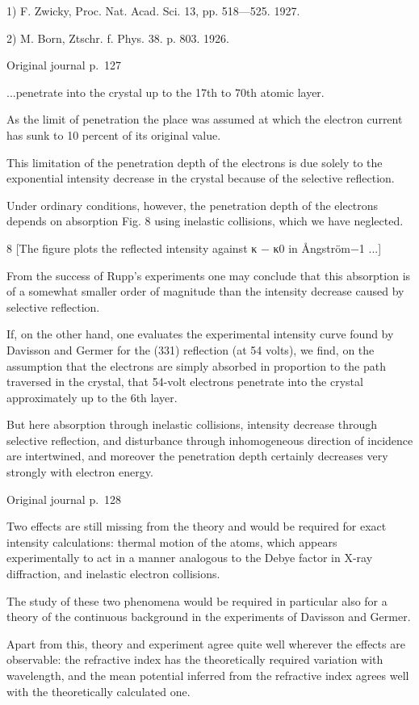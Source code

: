 \documentclass[10pt]{article}
\newcommand{\origpage}[1]{\par\medskip\noindent\hfill{\small\color{notegray}Original journal p.~#1}\hfill\mbox{}\par\smallskip}
\begin{document}
\noindent\footnotesize 1) F. Zwicky, Proc. Nat. Acad. Sci. 13, pp. 518—525. 1927.\par\normalsize
\noindent\footnotesize 2) M. Born, Ztschr. f. Phys. 38. p. 803. 1926.\par\normalsize
\origpage{127}
...penetrate into the crystal up to the 17th to 70th atomic layer.\par
As the limit of penetration the place was assumed at which the electron current has sunk to 10 percent of its original value.\par
This limitation of the penetration depth of the electrons is due solely to the exponential intensity decrease in the crystal because of the selective reflection.\par
Under ordinary conditions, however, the penetration depth of the electrons depends on absorption Fig. 8 using inelastic collisions, which we have neglected.\par
8 [The figure plots the reflected intensity against κ − κ0 in Ångström−1 ...]\par
From the success of Rupp’s experiments one may conclude that this absorption is of a somewhat smaller order of magnitude than the intensity decrease caused by selective reflection.\par
If, on the other hand, one evaluates the experimental intensity curve found by Davisson and Germer for the (331) reflection (at 54 volts), we find, on the assumption that the electrons are simply absorbed in proportion to the path traversed in the crystal, that 54-volt electrons penetrate into the crystal approximately up to the 6th layer.\par
But here absorption through inelastic collisions, intensity decrease through selective reflection, and disturbance through inhomogeneous direction of incidence are intertwined, and moreover the penetration depth certainly decreases very strongly with electron energy.\par
\origpage{128}
Two effects are still missing from the theory and would be required for exact intensity calculations: thermal motion of the atoms, which appears experimentally to act in a manner analogous to the Debye factor in X-ray diffraction, and inelastic electron collisions.\par
The study of these two phenomena would be required in particular also for a theory of the continuous background in the experiments of Davisson and Germer.\par
Apart from this, theory and experiment agree quite well wherever the effects are observable: the refractive index has the theoretically required variation with wavelength, and the mean potential inferred from the refractive index agrees well with the theoretically calculated one.\par
\end{document}
